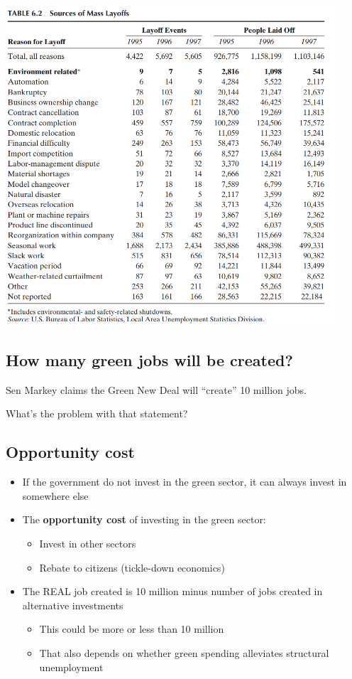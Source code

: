 \documentclass[
]{article}
\providecommand{\tightlist}{%
  \setlength{\itemsep}{0pt}\setlength{\parskip}{0pt}}
\begin{document}
\includegraphics[width=\textwidth,height=4.6875in]{figures/m7_layoff.png}

\hypertarget{how-many-green-jobs-will-be-created}{%
\subsection{How many green jobs will be
created?}\label{how-many-green-jobs-will-be-created}}

Sen Markey claims the Green New Deal will ``create'' 10 million jobs.

What's the problem with that statement?

\hypertarget{opportunity-cost}{%
\subsection{Opportunity cost}\label{opportunity-cost}}

\begin{itemize}
\tightlist
\item
  If the government do not invest in the green sector, it can always
  invest in somewhere else
\item
  The \textbf{opportunity cost} of investing in the green sector:

  \begin{itemize}
  \tightlist
  \item
    Invest in other sectors
  \item
    Rebate to citizens (tickle-down economics)
  \end{itemize}
\item
  The REAL job created is 10 million minus number of jobs created in
  alternative investments

  \begin{itemize}
  \tightlist
  \item
    This could be more or less than 10 million
  \item
    That also depends on whether green spending alleviates structural
    unemployment
  \end{itemize}
\end{itemize}
\end{document}
